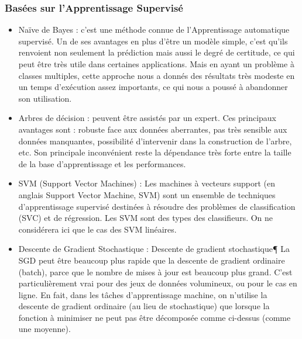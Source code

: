     \subsubsection{Basées sur l'Apprentissage Supervisé}
        \begin{itemize}
            \item{Naïve de Bayes : }
            c'est une méthode connue de l'Apprentissage automatique supervisé. Un de ses avantages en plus d'être un modèle simple, c'est qu'ils renvoient non seulement la prédiction mais aussi le degré de certitude, ce qui peut être très utile dans certaines applications. Mais en ayant un problème à classes multiples, cette approche nous a donnés des résultats très modeste en un temps d'exécution assez importants, ce qui nous a poussé à abandonner son utilisation.\\
            
            \item{Arbres de décision : }
            peuvent être assistés par un expert. Ces principaux avantages sont : robuste face aux données aberrantes, pas très sensible aux données manquantes, possibilité d’intervenir dans la construction de l’arbre, etc. Son principale inconvénient reste la dépendance très forte entre la taille de la base d’apprentissage et les performances.\\
            
            \item{SVM (Support Vector Machines) : }
            Les machines à vecteurs support (en anglais Support Vector Machine, SVM) sont un ensemble de techniques d’apprentissage supervisé destinées à résoudre des problèmes de classification (SVC) et de régression. Les SVM sont des types des classifieurs. On ne considérera ici que le cas des SVM linéaires.
            
            \item{Descente de Gradient Stochastique : }
            Descente de gradient stochastique¶
            La SGD peut être beaucoup plus rapide que la descente de gradient ordinaire (batch), parce que le nombre de mises à jour est beaucoup plus grand. C’est particulièrement vrai pour des jeux de données volumineux, ou pour le cas en ligne. En fait, dans les tâches d’apprentissage machine, on n’utilise la descente de gradient ordinaire (au lieu de stochastique) que lorsque la fonction à minimiser ne peut pas être décomposée comme ci-dessus (comme une moyenne).
        \end{itemize}

